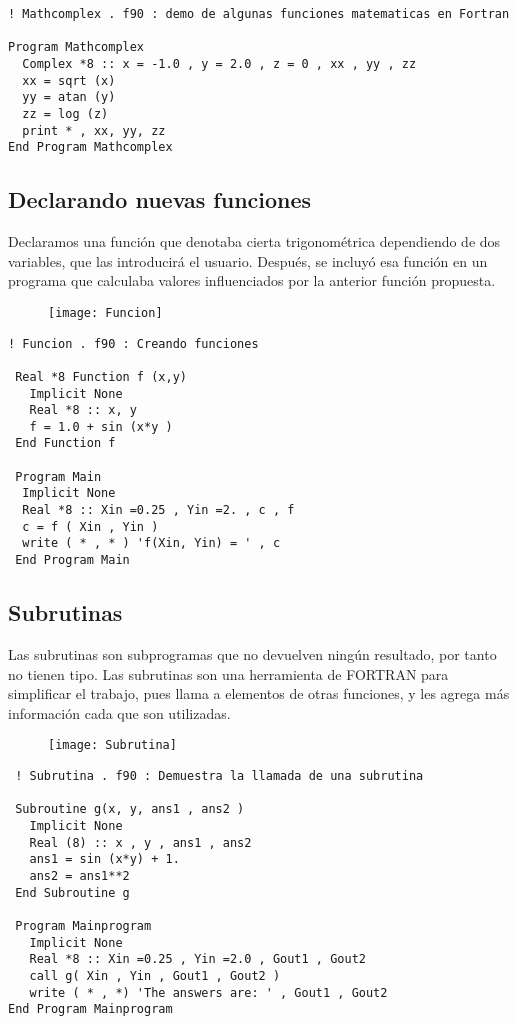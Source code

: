 \documentclass[12pt]{article}
\begin{document}
\begin{verbatim}! Mathcomplex . f90 : demo de algunas funciones matematicas en Fortran

Program Mathcomplex 
  Complex *8 :: x = -1.0 , y = 2.0 , z = 0 , xx , yy , zz
  xx = sqrt (x) 
  yy = atan (y) 
  zz = log (z)
  print * , xx, yy, zz 
End Program Mathcomplex\end{verbatim}

\subsection{Declarando nuevas funciones}
Declaramos una función que denotaba cierta trigonométrica dependiendo de dos variables, que las introducirá el usuario. Después, se incluyó esa función en un programa que calculaba valores influenciados por la anterior función propuesta.

\begin{figure}[H]
	\centering
    \texttt{[image: Funcion]}
\end{figure}

\begin{verbatim}! Funcion . f90 : Creando funciones

 Real *8 Function f (x,y)
   Implicit None
   Real *8 :: x, y
   f = 1.0 + sin (x*y )
 End Function f
 
 Program Main
  Implicit None 
  Real *8 :: Xin =0.25 , Yin =2. , c , f 
  c = f ( Xin , Yin )
  write ( * , * ) 'f(Xin, Yin) = ' , c
 End Program Main\end{verbatim}

\subsection{Subrutinas}
Las subrutinas son subprogramas que no devuelven ningún resultado, por tanto no tienen tipo. Las subrutinas son una herramienta de FORTRAN para simplificar el trabajo, pues llama a elementos de otras funciones, y les agrega más información cada que son utilizadas.

\begin{figure}[H]
	\centering
    \texttt{[image: Subrutina]}
\end{figure}

\begin{verbatim} ! Subrutina . f90 : Demuestra la llamada de una subrutina

 Subroutine g(x, y, ans1 , ans2 )
   Implicit None
   Real (8) :: x , y , ans1 , ans2 
   ans1 = sin (x*y) + 1.
   ans2 = ans1**2
 End Subroutine g
 
 Program Mainprogram 
   Implicit None
   Real *8 :: Xin =0.25 , Yin =2.0 , Gout1 , Gout2
   call g( Xin , Yin , Gout1 , Gout2 ) 
   write ( * , *) 'The answers are: ' , Gout1 , Gout2
End Program Mainprogram 
\end{verbatim}

\end{document}
